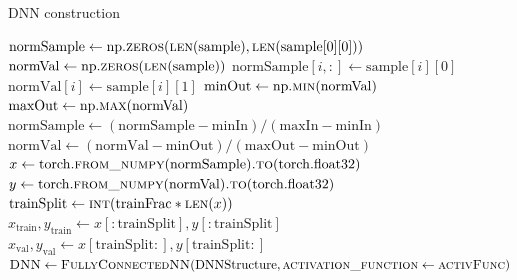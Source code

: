 \begin{algorithm}[H]%
\caption{\label{DNNConstruction}DNN construction}
\begin{algorithmic}[1]
\State $\mathrm{normSample} \gets \mathrm{np.}\Call{zeros}{\protect\Call{len}{\mathrm{sample}}, \protect\Call{len}{\mathrm{sample}[0][0]}}$
\State $\mathrm{normVal} \gets \mathrm{np.}\Call{zeros}{\protect\Call{len}{\mathrm{sample}}}$
\State $\mathrm{normSample}[i, :] \gets \mathrm{sample}[i][0]$
\State $\mathrm{normVal}[i] \gets \mathrm{sample}[i][1]$
\EndFor
\State $\mathrm{minOut} \gets \mathrm{np.}\Call{min}{\mathrm{normVal}}$
\State $\mathrm{maxOut} \gets \mathrm{np.}\Call{max}{\mathrm{normVal}}$
\State\label{inputScaling} $\mathrm{normSample} \gets (\mathrm{normSample}-\mathrm{minIn})/(\mathrm{maxIn}-\mathrm{minIn})$
\State\label{outputScaling} $\mathrm{normVal} \gets (\mathrm{normVal}-\mathrm{minOut})/(\mathrm{maxOut}-\mathrm{minOut})$
\State\label{tensorConversion1} $x \gets \mathrm{torch.}\Call{from\_numpy}{\mathrm{normSample}}\Call{.to}{\mathrm{torch.float32}}$
\State\label{tensorConversion2} $y \gets \mathrm{torch.}\Call{from\_numpy}{\mathrm{normVal}}\Call{.to}{\mathrm{torch.float32}}$
\State $\mathrm{trainSplit} \gets \Call{int}{\mathrm{trainFrac} * \protect\Call{len}{x}}$
\State $x_\mathrm{train}, y_\mathrm{train} \gets x[:\mathrm{trainSplit}], y[:\mathrm{trainSplit}]$
\State $x_\mathrm{val}, y_\mathrm{val} \gets x[\mathrm{trainSplit}:], y[\mathrm{trainSplit}:]$
\State $\textproc{DNN} \gets \Call{FullyConnectedNN}{\mathrm{DNNStructure}, \textproc{activation\_function}\gets\textproc{activFunc}}$

\end{algorithmic}
\end{algorithm}
